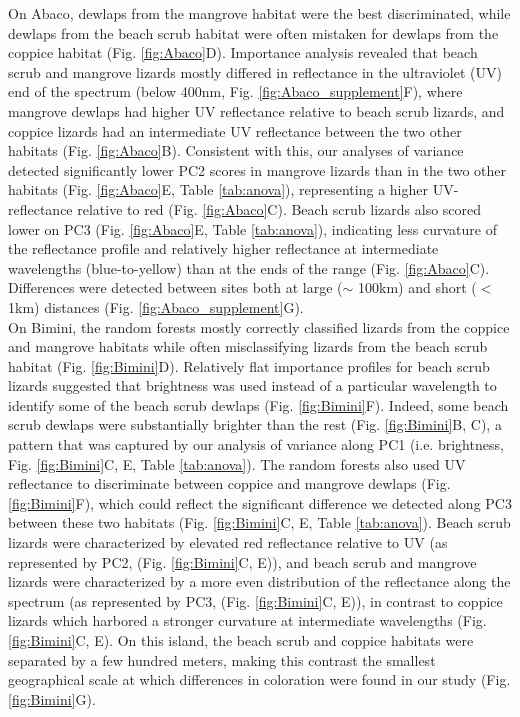 On Abaco, dewlaps from the mangrove habitat were the best discriminated, while dewlaps from the beach scrub habitat were often mistaken for dewlaps from the coppice habitat (Fig. \ref{fig:Abaco}D). Importance analysis revealed that beach scrub and mangrove lizards mostly differed in reflectance in the ultraviolet (UV) end of the spectrum (below 400nm, Fig. \ref{fig:Abaco_supplement}F), where mangrove dewlaps had higher UV reflectance relative to beach scrub lizards, and coppice lizards had an intermediate UV reflectance between the two other habitats (Fig. \ref{fig:Abaco}B). Consistent with this, our analyses of variance detected significantly lower PC2 scores in mangrove lizards than in the two other habitats (Fig. \ref{fig:Abaco}E, Table \ref{tab:anova}), representing a higher UV-reflectance relative to red (Fig. \ref{fig:Abaco}C). Beach scrub lizards also scored lower on PC3 (Fig. \ref{fig:Abaco}E, Table \ref{tab:anova}), indicating less curvature of the reflectance profile and relatively higher reflectance at intermediate wavelengths (blue-to-yellow) than at the ends of the range (Fig. \ref{fig:Abaco}C). Differences were detected between sites both at large ($\sim$ 100km) and short ($<$ 1km) distances (Fig. \ref{fig:Abaco_supplement}G).\\

On Bimini, the random forests mostly correctly classified lizards from the coppice and mangrove habitats while often misclassifying lizards from the beach scrub habitat (Fig. \ref{fig:Bimini}D). Relatively flat importance profiles for beach scrub lizards suggested that brightness was used instead of a particular wavelength to identify some of the beach scrub dewlaps (Fig. \ref{fig:Bimini}F). Indeed, some beach scrub dewlaps were substantially brighter than the rest (Fig. \ref{fig:Bimini}B, C), a pattern that was captured by our analysis of variance along PC1 (i.e. brightness, Fig. \ref{fig:Bimini}C, E, Table \ref{tab:anova}). The random forests also used UV reflectance to discriminate between coppice and mangrove dewlaps (Fig. \ref{fig:Bimini}F), which could reflect the significant difference we detected along PC3 between these two habitats (Fig. \ref{fig:Bimini}C, E, Table \ref{tab:anova}). Beach scrub lizards were characterized by elevated red reflectance relative to UV (as represented by PC2, (Fig. \ref{fig:Bimini}C, E)), and beach scrub and mangrove lizards were characterized by a more even distribution of the reflectance along the spectrum (as represented by PC3, (Fig. \ref{fig:Bimini}C, E)), in contrast to coppice lizards which harbored a stronger curvature at intermediate wavelengths (Fig. \ref{fig:Bimini}C, E). On this island, the beach scrub and coppice habitats were separated by a few hundred meters, making this contrast the smallest geographical scale at which differences in coloration were found in our study (Fig. \ref{fig:Bimini}G).\\


